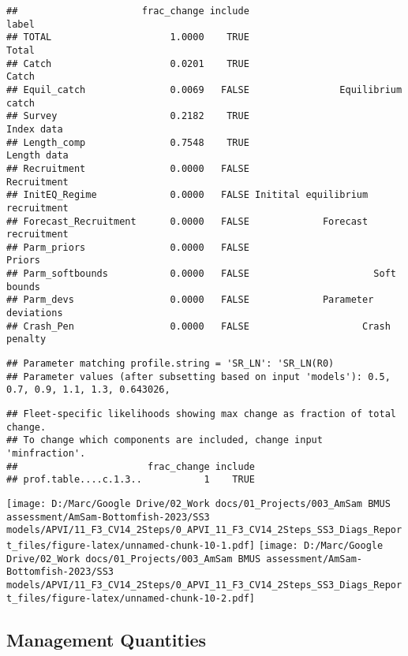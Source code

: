 \documentclass[
]{article}
\begin{document}
\begin{verbatim}
##                      frac_change include                            label
## TOTAL                     1.0000    TRUE                            Total
## Catch                     0.0201    TRUE                            Catch
## Equil_catch               0.0069   FALSE                Equilibrium catch
## Survey                    0.2182    TRUE                       Index data
## Length_comp               0.7548    TRUE                      Length data
## Recruitment               0.0000   FALSE                      Recruitment
## InitEQ_Regime             0.0000   FALSE Initital equilibrium recruitment
## Forecast_Recruitment      0.0000   FALSE             Forecast recruitment
## Parm_priors               0.0000   FALSE                           Priors
## Parm_softbounds           0.0000   FALSE                      Soft bounds
## Parm_devs                 0.0000   FALSE             Parameter deviations
## Crash_Pen                 0.0000   FALSE                    Crash penalty
\end{verbatim}

\begin{verbatim}
## Parameter matching profile.string = 'SR_LN': 'SR_LN(R0)
## Parameter values (after subsetting based on input 'models'): 0.5, 0.7, 0.9, 1.1, 1.3, 0.643026,
\end{verbatim}

\begin{verbatim}
## Fleet-specific likelihoods showing max change as fraction of total change.
## To change which components are included, change input 'minfraction'.
##                       frac_change include
## prof.table....c.1.3..           1    TRUE
\end{verbatim}

\texttt{[image: D:/Marc/Google Drive/02\_Work docs/01\_Projects/003\_AmSam BMUS assessment/AmSam-Bottomfish-2023/SS3 models/APVI/11\_F3\_CV14\_2Steps/0\_APVI\_11\_F3\_CV14\_2Steps\_SS3\_Diags\_Report\_files/figure-latex/unnamed-chunk-10-1.pdf]}
\texttt{[image: D:/Marc/Google Drive/02\_Work docs/01\_Projects/003\_AmSam BMUS assessment/AmSam-Bottomfish-2023/SS3 models/APVI/11\_F3\_CV14\_2Steps/0\_APVI\_11\_F3\_CV14\_2Steps\_SS3\_Diags\_Report\_files/figure-latex/unnamed-chunk-10-2.pdf]}

\hypertarget{management-quantities}{%
\subsection{Management Quantities}\label{management-quantities}}
\end{document}

